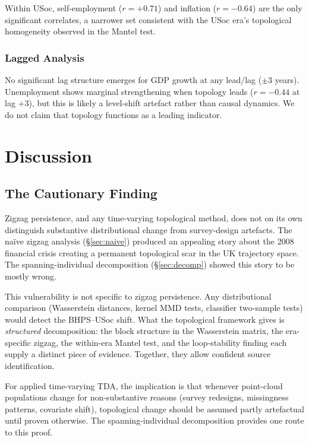 Within USoc, self-employment ($r = +0.71$) and inflation ($r = -0.64$) are the
only significant correlates, a narrower set consistent with the USoc era's
topological homogeneity observed in the Mantel test.

\subsubsection{Lagged Analysis}

No significant lag structure emerges for GDP growth at any lead/lag ($\pm 3$
years).
Unemployment shows marginal strengthening when topology leads ($r = -0.44$ at
lag $+3$), but this is likely a level-shift artefact rather than causal dynamics.
We do not claim that topology functions as a leading indicator.

\section{Discussion}
\label{sec:discussion}

\subsection{The Cautionary Finding}

Zigzag persistence, and any time-varying topological method, does not on its own
distinguish substantive distributional change from survey-design artefacts.
The na\"ive zigzag analysis (\S\ref{sec:naive}) produced an appealing story about
the 2008 financial crisis creating a permanent topological scar in the UK
trajectory space.
The spanning-individual decomposition (\S\ref{sec:decomp}) showed this story to
be mostly wrong.

This vulnerability is not specific to zigzag persistence.
Any distributional comparison (Wasserstein distances, kernel MMD tests, classifier
two-sample tests) would detect the BHPS--USoc shift.
What the topological framework gives is \emph{structured} decomposition: the
block structure in the Wasserstein matrix, the era-specific zigzag, the within-era
Mantel test, and the loop-stability finding each supply a distinct piece of
evidence.
Together, they allow confident source identification.

For applied time-varying TDA, the implication is that whenever point-cloud
populations change for non-substantive reasons (survey redesigns, missingness
patterns, covariate shift), topological change should be assumed partly artefactual
until proven otherwise.
The spanning-individual decomposition provides one route to this proof.

